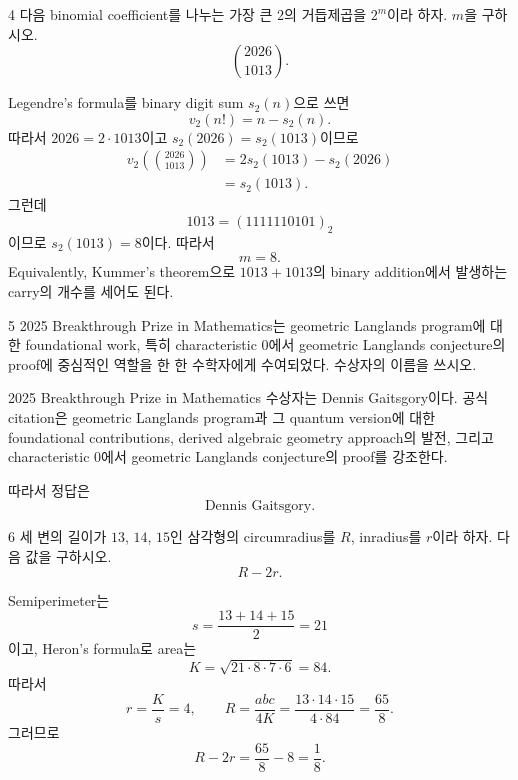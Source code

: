 \begin{problem}{4}
다음 binomial coefficient를 나누는 가장 큰 $2$의 거듭제곱을 $2^m$이라 하자. $m$을 구하시오.
\[
    \binom{2026}{1013}.
\]
\end{problem}

\begin{solution}
Legendre's formula를 binary digit sum $s_2(n)$으로 쓰면
\[
    v_2(n!)=n-s_2(n).
\]
따라서 $2026=2\cdot1013$이고 $s_2(2026)=s_2(1013)$이므로
\[
    \begin{aligned}
    v_2\!\left(\binom{2026}{1013}\right)
    &=
    2s_2(1013)-s_2(2026)\\
    &=s_2(1013).
    \end{aligned}
\]
그런데
\[
    1013=(1111110101)_2
\]
이므로 $s_2(1013)=8$이다. 따라서
\[
    \boxed{m=8}.
\]
Equivalently, Kummer's theorem으로 $1013+1013$의 binary addition에서 발생하는 carry의 개수를 세어도 된다.
\end{solution}

\begin{problem}{5}
2025 Breakthrough Prize in Mathematics는 geometric Langlands program에 대한 foundational work, 특히 characteristic $0$에서 geometric Langlands conjecture의 proof에 중심적인 역할을 한 한 수학자에게 수여되었다. 수상자의 이름을 쓰시오.
\end{problem}

\begin{solution}
2025 Breakthrough Prize in Mathematics 수상자는 Dennis Gaitsgory이다. 공식 citation은 geometric Langlands program과 그 quantum version에 대한 foundational contributions, derived algebraic geometry approach의 발전, 그리고 characteristic $0$에서 geometric Langlands conjecture의 proof를 강조한다.

따라서 정답은
\[
    \boxed{\text{Dennis Gaitsgory}}.
\]
\end{solution}

\begin{problem}{6}
세 변의 길이가 $13$, $14$, $15$인 삼각형의 circumradius를 $R$, inradius를 $r$이라 하자. 다음 값을 구하시오.
\[
    R-2r.
\]
\end{problem}

\begin{solution}
Semiperimeter는
\[
    s=\frac{13+14+15}{2}=21
\]
이고, Heron's formula로 area는
\[
    K
    =
    \sqrt{21\cdot8\cdot7\cdot6}
    =84.
\]
따라서
\[
    r=\frac{K}{s}=4,
    \qquad
    R=\frac{abc}{4K}
    =\frac{13\cdot14\cdot15}{4\cdot84}
    =\frac{65}{8}.
\]
그러므로
\[
    R-2r
    =
    \frac{65}{8}-8
    =
    \boxed{\frac18}.
\]
\end{solution}


